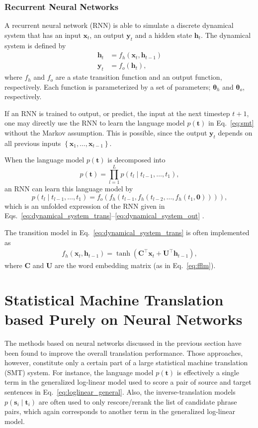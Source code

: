 \documentclass[11pt, oneside]{essay}
\newcommand{\vect}[1]{\mathbf{#1}}
\newcommand{\vects}[1]{\boldsymbol{#1}}
\newcommand{\matr}[1]{\mathbf{#1}}
\newcommand{\vh}[0]{\vect{h}}
\newcommand{\vx}[0]{\vect{x}}
\newcommand{\vs}[0]{\vect{s}}
\newcommand{\vy}[0]{\vect{y}}
\newcommand{\vt}[0]{\vect{t}}
\newcommand{\mU}[0]{\matr{U}}
\newcommand{\mC}{\matr{C}}
\newcommand{\vzero}[0]{\vect{0}}
\newcommand{\TT}[0]{{\vects{\theta}}}
\begin{document}
\subsubsection{Recurrent Neural Networks}

A recurrent neural network (RNN) is able to simulate a discrete
dynamical system that has an input $\vx_t$, an output $\vy_t$ and
a hidden state $\vh_t$.  The dynamical system is defined by
\begin{align}
    \label{eq:dynamical_system_trans}
    \vh_t &= f_h(\vx_t, \vh_{t-1}) 
    \\
    \label{eq:dynamical_system_out}
    \vy_t &= f_o(\vh_t),
\end{align}
where $f_h$ and $f_o$ are a state transition function and an
output function, respectively. Each function is parameterized by
a set of parameters; $\TT_h$ and $\TT_o$, respectively. 

If an RNN is trained to output, or predict, the input at the next
timestep $t+1$, one may directly use the RNN to learn the
language model $p(\vt)$ in Eq.~\eqref{eq:smt} without the Markov
assumption. This is possible, since the output $\vy_t$ depends on
all previous inputs $\left\{ \vx_1, \dots, \vx_{t-1} \right\}$.

When the language model $p(\vt)$ is decomposed into
\[
    p(\vt) = \prod_{l=1}^L p(t_l \mid t_{l-1}, \dots, t_1),
\]
an RNN can learn this language model by 
\[
    p(t_l \mid t_{l-1}, \dots, t_1) = f_o(f_h(t_{l-1},
    f_h(t_{l-2}, \dots, f_h(t_1, \vzero)))),
\]
which is an unfolded expression of the RNN given in
Eqs.~\eqref{eq:dynamical_system_trans}--\eqref{eq:dynamical_system_out}
\citep{Mikolov2010}.

The transition model in Eq.~\eqref{eq:dynamical_system_trans} is
often implemented as
\begin{align}
\label{eq:rnn_simple_trans}
f_h(\vx_t, \vh_{t-1}) = \tanh\left( \mC^\top \vx_t + \mU^\top
        \vh_{t-1}\right),
\end{align}
where $\mC$ and $\mU$ are the word embedding matrix (as in
Eq.~\eqref{eq:fflm}). 




\section{Statistical Machine Translation based Purely on Neural Networks}

The methods based on neural networks discussed in the previous
section have been found to improve the overall translation
performance. Those approaches, however, constitute only a certain
part of a large statistical machine translation (SMT) system. For
instance, the language model $p(\vt)$ is effectively a single
term in the generalized log-linear model used to score a pair of
source and target sentences in Eq.~\eqref{eq:loglinear_general}.
Also, the inverse-translation models $p(\vs_i \mid \vt_i)$ are
often used to only rescore/rerank the list of candidate phrase
pairs, which again corresponds to another term in the generalized
log-linear model.
\end{document}

